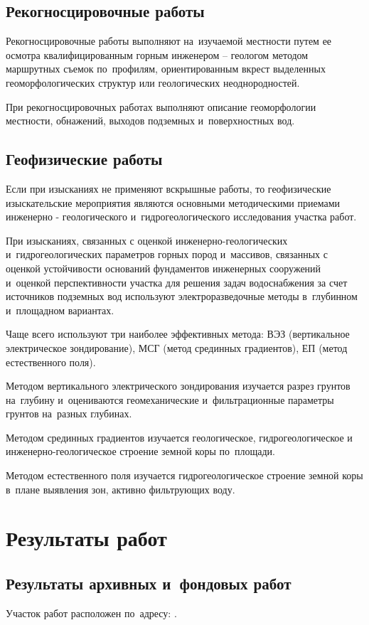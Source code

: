 \subsection{Рекогносцировочные работы}
Рекогносцировочные работы выполняют на~изучаемой местности путем ее осмотра квалифицированным горным инженером -- геологом методом маршрутных съемок по~профилям, ориентированным вкрест выделенных геоморфологических структур или геологических неоднородностей.

При рекогносцировочных работах выполняют описание геоморфологии местности, обнажений, выходов подземных и~поверхностных вод.

\subsection{Геофизические работы}
Если при изысканиях не применяют вскрышные работы, то геофизические изыскательские мероприятия являются основными методическими приемами инженерно - геологического и~гидрогеологического исследования участка работ.

При изысканиях, связанных с оценкой инженерно-геологических и~гидрогеологических параметров горных пород и~массивов, связанных с оценкой устойчивости оснований фундаментов инженерных сооружений и~оценкой перспективности участка для решения задач водоснабжения за счет источников подземных вод используют электроразведочные методы в~глубинном и~площадном вариантах.

Чаще всего используют три наиболее эффективных метода:  ВЭЗ (вертикальное электрическое зондирование), МСГ (метод срединных градиентов), ЕП (метод естественного поля).

Методом вертикального электрического зондирования изучается разрез грунтов на~глубину и~оцениваются геомеханические и~фильтрационные параметры грунтов на~разных глубинах.

Методом срединных градиентов изучается геологическое, гидрогеологическое и инженерно-геологическое строение земной коры по~площади.

Методом естественного поля изучается гидрогеологическое строение земной коры в~плане выявления зон, активно фильтрующих воду.

\section{Результаты работ}
\subsection{Результаты архивных и~фондовых работ}
Участок работ расположен по~адресу: \txtAddress.

